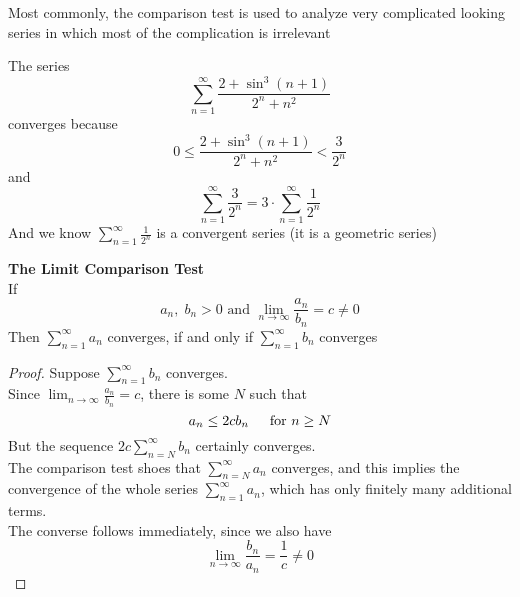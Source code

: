 Most commonly, the comparison test is used to analyze very complicated looking series in which most of the complication is irrelevant

\begin{eg}
    The series
    $$\sum_{n=1}^\infty \frac{2 + \sin^3(n+1)}{2^n + n^2}$$
    converges because 
    $$0 \leq \frac{2 + \sin^3(n+1)}{2^n + n^2} < \frac{3}{2^n}$$
    and 
    $$\sum_{n=1}^\infty \frac{3}{2^n} = 3 \cdot \sum_{n=1}^\infty \frac{1}{2^n}$$
    And we know $\sum_{n=1}^\infty \frac{1}{2^n}$ is a convergent series (it is a geometric series)
\end{eg}

\begin{theorem}
    \textbf{The Limit Comparison Test}\\
    If 
    $$a_n, \; b_n > 0 \text{ and } \lim_{n \to \infty}\frac{a_n}{b_n} = c \neq 0$$
    Then $\sum _{n=1}^ \infty a_n$ converges, if and only if $\sum_{n = 1}^ \infty b_n$ converges
\end{theorem}
\begin{proof}
    Suppose $\sum_{n = 1}^ \infty b_n$ converges. \\
    Since $\lim_{n \to \infty}\frac{a_n}{b_n} = c$, there is some $N$ such that 
    $$a_n \leq 2cb_n \indent \text{for } n\geq N$$
    But the sequence $2c\sum_{n=N}^\infty b_n$ certainly converges.\\
    The comparison test shoes that $\sum _{n=N}^ \infty a_n$ converges, and this implies the convergence of the whole series $\sum _{n=1}^ \infty a_n$, which has only finitely many additional terms.\\
    The converse follows immediately, since we also have
    $$\lim_{n\to \infty} \frac{b_n}{a_n}=\frac{1}{c}\neq 0$$
\end{proof}

